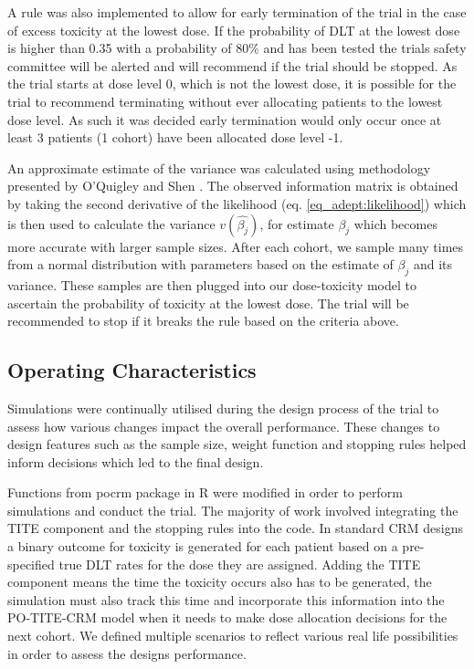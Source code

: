 A rule was also implemented to allow for early termination of the trial in the case of excess toxicity at the lowest dose. If the probability of DLT at the lowest dose is higher than 0.35 with a probability of 80\% and has been tested the trials safety committee will be alerted and will recommend if the trial should be stopped. As the trial starts at dose level 0, which is not the lowest dose, it is possible for the trial to recommend terminating without ever allocating patients to the lowest dose level. As such it was decided early termination would only occur once at least 3 patients (1 cohort) have been allocated dose level -1. 

An approximate estimate of the variance was calculated using methodology presented by O'Quigley and Shen \cite{oquigleyContinualReassessmentMethod1996}. The observed information matrix is obtained by taking the second derivative of the likelihood (eq. \ref{eq_adept:likelihood}) which is then used to calculate the variance $v(\hat{\beta_j})$, for estimate $\beta_j$ which becomes more accurate with larger sample sizes. After each cohort, we sample many times from a normal distribution with parameters based on the estimate of $\beta_j$ and its variance. These samples are then plugged into our dose-toxicity model to ascertain the probability of toxicity at the lowest dose. The trial will be recommended to stop if it breaks the rule based on the criteria above. 


\subsection{Operating Characteristics}
\label{adept:OCs} 

Simulations were continually utilised during the design process of the trial to assess how various changes impact the overall performance. These changes to design features such as the sample size, weight function and stopping rules helped inform decisions which led to the final design.  

Functions from pocrm package in R \cite{wagesPocrmRpackagePhase2013, wagesPocrmDoseFinding2019} were modified in order to perform simulations and conduct the trial. The majority of work involved integrating the TITE component and the stopping rules into the code. In standard CRM designs a binary outcome for toxicity is generated for each patient based on a pre-specified true DLT rates for the dose they are assigned. Adding the TITE component means the time the toxicity occurs also has to be generated, the simulation must also track this time and incorporate this information into the PO-TITE-CRM model when it needs to make dose allocation decisions for the next cohort. We defined multiple scenarios to reflect various real life possibilities in order to assess the designs performance.  

